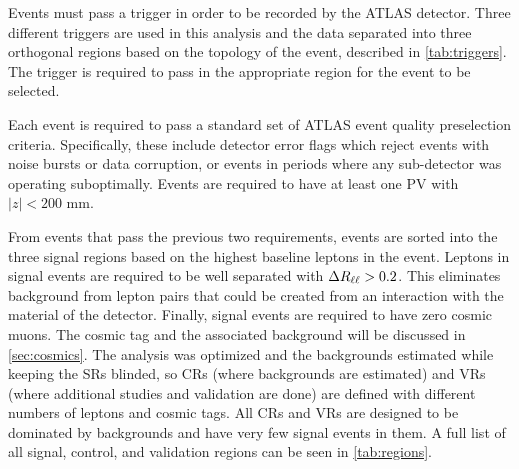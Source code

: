 Events must pass a trigger in order to be recorded by the \ac{ATLAS} detector. Three different triggers are used in this analysis and the data separated into three orthogonal regions based on the topology of the event, described in \autoref{tab:triggers}. The trigger is required to pass in the appropriate region for the event to be selected.

Each event is required to pass a standard set of \ac{ATLAS} event quality preselection criteria. Specifically, these include detector error flags which reject events with noise bursts or data corruption, or events in periods where any sub-detector was operating suboptimally. Events are required to have at least one \ac{PV} with $|z| < 200$ mm.

From events that pass the previous two requirements, events are sorted into the three signal regions based on the highest \pt baseline leptons in the event. Leptons in signal events are required to be well separated with $\Delta R_{\ell\ell} > 0.2$. This eliminates background from lepton pairs that could be created from an interaction with the material of the detector. Finally, signal events are required to have zero cosmic muons. The cosmic tag and the associated background will be discussed in \autoref{sec:cosmics}. The analysis was optimized and the backgrounds estimated while keeping the \acp{SR} blinded, so \acp{CR} (where backgrounds are estimated) and \acp{VR} (where additional studies and validation are done) are defined with different numbers of leptons and cosmic tags. All \acp{CR} and \acp{VR} are designed to be dominated by backgrounds and have very few signal events in them. A full list of all signal, control, and validation regions can be seen in \autoref{tab:regions}. 


